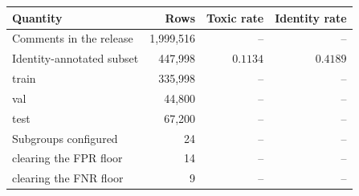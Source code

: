 \begin{tabular}{lrrr}
\toprule
Quantity & Rows & Toxic rate & Identity rate \\
\midrule
Comments in the release & 1,999,516 & -- & -- \\
Identity-annotated subset & 447,998 & $0.1134$ & $0.4189$ \\
\addlinespace
\quad train & 335,998 & -- & -- \\
\quad val & 44,800 & -- & -- \\
\quad test & 67,200 & -- & -- \\
\midrule
Subgroups configured & 24 & -- & -- \\
\quad clearing the FPR floor & 14 & -- & -- \\
\quad clearing the FNR floor & 9 & -- & -- \\
\bottomrule
\end{tabular}
